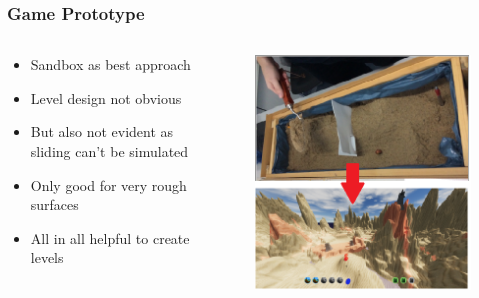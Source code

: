 \documentclass[xcolor=dvipsnames]{beamer}
\begin{document}
	\begin{frame}
		\frametitle{Game Prototype}
		\begin{columns}[T]
			\begin{column}{0.5\textwidth}
				\vspace{1cm}
				\begin{itemize}
					\setlength\itemsep{1em}
					\item Sandbox as best approach
					\item Level design not obvious
					\item But also not evident as sliding can't be simulated
					\item Only good for very rough surfaces
					\item All in all helpful to create levels
				\end{itemize}
			\end{column}
			\hspace{-1cm}
			\begin{column}{0.5\textwidth}
				\begin{figure}[ht]
					\includegraphics[scale=0.5]{images/final/Bild1}
				\end{figure}
			\end{column}
		\end{columns}
	\end{frame}
	
\end{document}
